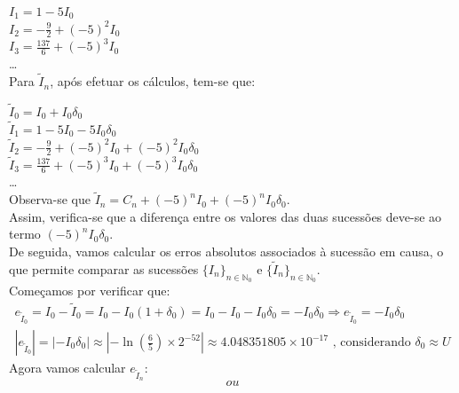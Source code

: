 \documentclass[12pt,a4paper]{article}
\begin{document}
         \(I_1=1-5I_0\)\\
         
         \(I_2=-\frac{9}{2}+(-5)^2I_0\)\\
         
         \(I_3=\frac{137}{6}+(-5)^3I_0\)\\[-10pt]
         
         \ldots\\

        Para \(\tilde{I}_n\), após efetuar os cálculos, tem-se que:
        
        \(\tilde{I}_{0}=I_0+I_0\delta_0\)\\
        
        \(\tilde{I}_1=1-5I_0-5I_0\delta_0\)\\
         
        \(\tilde{I}_2=-\frac{9}{2}+(-5)^2I_0+(-5)^2I_0\delta_0\)\\
         
        \(\tilde{I}_3=\frac{137}{6}+(-5)^3I_0+(-5)^3I_0\delta_0\)\\[-10pt]
         
        \ldots\\

    \noindent Observa-se que \(\tilde{I}_{n}=C_n+(-5)^nI_0+(-5)^nI_0\delta_0\).\\
    
    \noindent Assim, verifica-se que a diferença entre os valores das duas sucessões deve-se ao termo \((-5)^nI_0\delta_0\).\\

    \noindent De seguida, vamos calcular os erros absolutos associados à sucessão em causa, o que permite comparar as sucessões \( \{I_n\}_{n \in \mathbb{N}_0} \) e \( \{\tilde{I}_n\}_{n \in \mathbb{N}_0} \).
\\[30pt]


    Começamos por verificar que:\\[-30pt]
    \begin{align*}

    e_{\tilde{I}_0}=I_0-\tilde{I}_0=I_0-I_0(1+\delta_0)=I_0-I_0-I_0\delta_0=-I_0\delta_0 \Rightarrow e_{\tilde{I}_0}=-I_0\delta_0\\[-5pt]
    
    |e_{\tilde{I}_0}|=|-I_0\delta_0| \approx |-\ln(\frac{6}{5})\times2^{-52}|\approx4.048351805\times10^{-17} \text{  ,  considerando } \delta_0 \approx U
    \end{align*}
    Agora vamos calcular \(e_{\tilde{I}_n}\):
    \[ou\]
    
\end{document}
